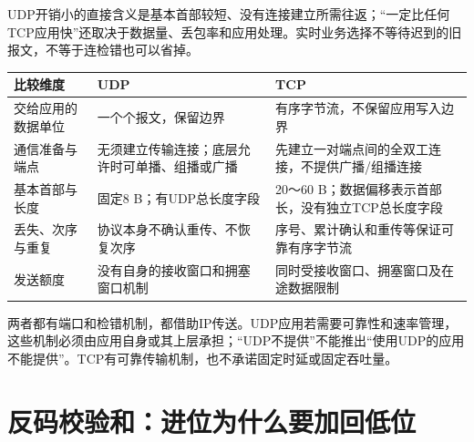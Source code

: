 UDP开销小的直接含义是基本首部较短、没有连接建立所需往返；``一定比任何TCP应用快''还取决于数据量、丢包率和应用处理。实时业务选择不等待迟到的旧报文，不等于连检错也可以省掉。

\begin{wideblock}

\par\medskip\noindent\begin{minipage}{\linewidth}\fontsize{9.3}{12}\selectfont\begin{tabularx}{\linewidth}{@{}YYY@{}}
\toprule\noalign{}
\begin{minipage}[b]{\linewidth}\raggedright
比较维度
\end{minipage} & \begin{minipage}[b]{\linewidth}\raggedright
UDP
\end{minipage} & \begin{minipage}[b]{\linewidth}\raggedright
TCP
\end{minipage} \\
\midrule\noalign{}


交给应用的数据单位 & 一个个报文，保留边界 & 有序字节流，不保留应用写入边界 \\
通信准备与端点 & 无须建立传输连接；底层允许时可单播、组播或广播 & 先建立一对端点间的全双工连接，不提供广播/组播连接 \\
基本首部与长度 & 固定8 B；有UDP总长度字段 & 20～60 B；数据偏移表示首部长，没有独立TCP总长度字段 \\
丢失、次序与重复 & 协议本身不确认重传、不恢复次序 & 序号、累计确认和重传等保证可靠有序字节流 \\
发送额度 & 没有自身的接收窗口和拥塞窗口机制 & 同时受接收窗口、拥塞窗口及在途数据限制 \\
\bottomrule\end{tabularx}
\end{minipage}\par\medskip

\end{wideblock}

两者都有端口和检错机制，都借助IP传送。UDP应用若需要可靠性和速率管理，这些机制必须由应用自身或其上层承担；``UDP不提供''不能推出``使用UDP的应用不能提供''。TCP有可靠传输机制，也不承诺固定时延或固定吞吐量。

\section{反码校验和：进位为什么要加回低位}\label{CN05-03}

